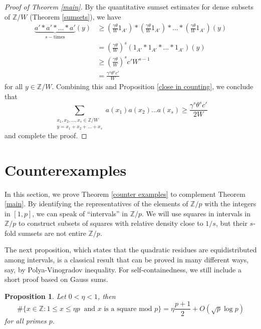 \documentclass[11pt]{amsart}
\theoremstyle{plain} %
\newtheorem{prop}[thm]{Proposition}
\theoremstyle{remark}
\numberwithin{equation}{section}
\newcommand{\Z}{\mathbb{Z}}
\begin{document}
\begin{proof}[Proof of Theorem \ref{main}]
    By the quantitative sumset estimates for dense subsets of $\Z/W$ (Theorem \ref{sumsets}), we have
    \begin{equation*}
        \begin{split}
            \underbrace{a'*a'*...*a'}_{s-\text{times}}(y)&\geq \left(\frac{\gamma\theta}{W}1_{A'}\right)*\left(\frac{\gamma\theta}{W}1_{A'}\right)*...*\left(\frac{\gamma\theta}{W}1_{A'}\right)(y)\\
            &=\left(\frac{\gamma\theta}{W}\right)^s (1_{A'}*1_{A'}*...*1_{A'})(y)\\
            &\geq \left(\frac{\gamma\theta}{W}\right)^s c'W^{s-1}\\
            &=\frac{\gamma^s\theta^s c'}{W}
        \end{split}
    \end{equation*}
    for all $y\in\Z/W$. Combining this and Proposition \ref{close in counting}, we conclude that
    \begin{equation*}
        \sum_{\substack{x_1,x_2,...,x_s\in\Z/W\\y=x_1+x_2+...+x_s}}a(x_1)a(x_2)...a(x_s)\geq \frac{\gamma^s\theta^s c'}{2W}
    \end{equation*}
    and complete the proof.
\end{proof}

\section{Counterexamples}\label{sec: counter examples}

In this section, we prove Theorem \ref{counter examples} to complement Theorem \ref{main}. By identifying the representatives of the elements of $\Z/p$ with the integers in $[1,p]$, we can speak of ``intervals'' in $\Z/p$. We will use squares in intervals in $\Z/p$ to construct subsets of squares with relative density close to $1/s$, but their $s$-fold sumsets are not entire $\Z/p$.

The next proposition, which states that the quadratic residues are equidistributed among intervals, is a classical result that can be proved in many different ways, say, by Polya-Vinogradov inequality. For self-containedness, we still include a short proof based on Gauss sums.

\begin{prop}\label{equidistribution}
    Let $0<\eta<1$, then
    \begin{equation*}
        \#\{x\in\Z:1\leq x\leq \eta p\;\;\text{and $x$ is a square mod $p$}\}=\eta\frac{p+1}{2}+O(\sqrt{p}\log p)
    \end{equation*}
    for all primes $p$.
\end{prop}
\end{document}
